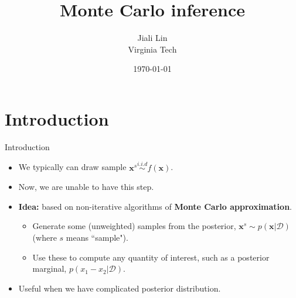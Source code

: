 \documentclass[10pt,mathserif]{beamer}
\title{\large \bfseries Monte Carlo inference}
\author{Jiali Lin\\[3ex]
Virginia Tech}
\date{\today}
\begin{document}
\frame{
\thispagestyle{empty}
\titlepage
}

\section{Introduction}
\begin{frame}{Introduction}
\begin{itemize}
    \item We typically can draw sample $\bm{x}^s \overset{i.i.d}{\sim}f(\bm{x})$. 
    \item Now, we are unable to have this step.
    \item \textbf{Idea:} based on non-iterative algorithms of \textbf{Monte Carlo approximation}.
    \begin{itemize}
        \item Generate some (unweighted) samples from the posterior, $\bm{x}^s\sim p(\bm{x}|\mathcal{D})$ (where $s$ means ``sample").
        \item Use these to compute any quantity of interest, such as a posterior marginal, $p(x_1 - x_2|\mathcal{D})$.
    \end{itemize}
    \item Useful when we have complicated posterior distribution. 
\end{itemize}    
\end{frame}
\end{document}

